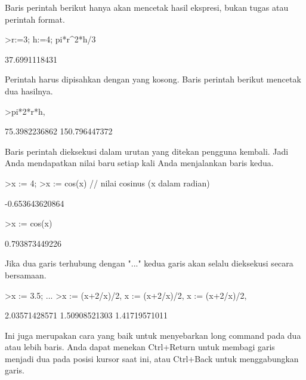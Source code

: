 \documentclass[a4paper,10pt]{article}
\begin{document}
\begin{eulernotebook}
\begin{eulercomment}
\begin{eulercomment}
\begin{eulercomment}
Baris perintah berikut hanya akan mencetak hasil ekspresi, bukan tugas
atau perintah format.
\end{eulercomment}
\begin{eulerprompt}
>r:=3; h:=4; pi*r^2*h/3
\end{eulerprompt}
\begin{euleroutput}
  37.6991118431
\end{euleroutput}
\begin{eulercomment}
Perintah harus dipisahkan dengan yang kosong. Baris perintah berikut
mencetak dua hasilnya.
\end{eulercomment}
\begin{eulerprompt}
>pi*2*r*h, %
\end{eulerprompt}
\begin{euleroutput}
  75.3982236862
  150.796447372
\end{euleroutput}
\begin{eulercomment}
Baris perintah dieksekusi dalam urutan yang ditekan pengguna kembali.
Jadi Anda mendapatkan nilai baru setiap kali Anda menjalankan baris
kedua.
\end{eulercomment}
\begin{eulerprompt}
>x := 4;
>x := cos(x) // nilai cosinus (x dalam radian)
\end{eulerprompt}
\begin{euleroutput}
  -0.653643620864
\end{euleroutput}
\begin{eulerprompt}
>x := cos(x)
\end{eulerprompt}
\begin{euleroutput}
  0.793873449226
\end{euleroutput}
\begin{eulercomment}
Jika dua garis terhubung dengan "..." kedua garis akan selalu
dieksekusi secara bersamaan.
\end{eulercomment}
\begin{eulerprompt}
>x := 3.5; ...
>x := (x+2/x)/2, x := (x+2/x)/2, x := (x+2/x)/2,
\end{eulerprompt}
\begin{euleroutput}
  2.03571428571
  1.50908521303
  1.41719571011
\end{euleroutput}
\begin{eulercomment}
Ini juga merupakan cara yang baik untuk menyebarkan long command pada
dua atau lebih baris. Anda dapat menekan Ctrl+Return untuk membagi
garis menjadi dua pada posisi kursor saat ini, atau Ctrl+Back untuk
menggabungkan garis.


\end{eulercomment}
\end{eulercomment}
\end{eulercomment}
\end{eulernotebook}
\end{document}
